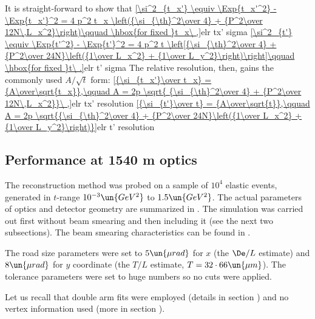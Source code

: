 It is straight-forward to show that
\eqref{\si^2_{t_x'} \equiv \Exp{t_x'^2} - \Exp{t_x'}^2 = 4 p^2 t_x \left({\si_{\th}^2\over 4} + {P^2\over 12N\,L_x^2}\right)\qquad \hbox{for fixed }t_x\ ,}{elr tx' sigma}
\eqref{\si^2_{t'} \equiv \Exp{t'^2} - \Exp{t'}^2 = 4 p^2 t \left[{\si_{\th}^2\over 4} + {P^2\over 24N}\left({1\over L_x^2} + {1\over L_y^2}\right)\right]\qquad \hbox{for fixed }t\ .}{elr t' sigma}
The relative resolution, then, gains the commonly used $A/\sqrt{t}$ form:
\eqref{{\si_{t_x'}\over t_x}  = {A\over\sqrt{t_x}},\qquad A = 2p \sqrt{ {\si_{\th}^2\over 4} + {P^2\over 12N\,L_x^2}}\ ,}{elr tx' resolution}
\eqref{{\si_{t'}\over t}  = {A\over\sqrt{t}},\qquad A = 2p \sqrt{{\si_{\th}^2\over 4} + {P^2\over 24N}\left({1\over L_x^2} + {1\over L_y^2}\right)}}{elr t' resolution}

\iffalse
One may also define variable $\de$
\eqref{\de^2 = {(t_x' - t_x)^2\over t_x^2} \Rightarrow \sqrt{\Exp{\de^2}} = {\si_{t_x'}\over t_x}}{elr delta for tx}
\fi

\subsection[1540]{Performance at 1540 m optics}

The reconstruction method was probed on a sample of $10^4$ elastic events, generated in $t$-range $10^{-3}\un{GeV^2}$ to $1.5\un{GeV^2}$. The actual parameters of optics and detector geometry are summarized in . The simulation was carried out first without beam smearing and then including it (see the next two subsections). The beam smearing characteristics can be found in .

The road size parameters were set to $5\un{\mu rad}$ for $x$ (the $\De/L$ estimate) and $8\un{\mu rad}$ for $y$ coordinate (the $T/L$ estimate, $T = 32\cdot 66\un{\mu m}$). The tolerance parameters were set to huge numbers so no cuts were applied.

Let us recall that double arm fits were employed (details in section ) and no vertex information used (more in section ).


